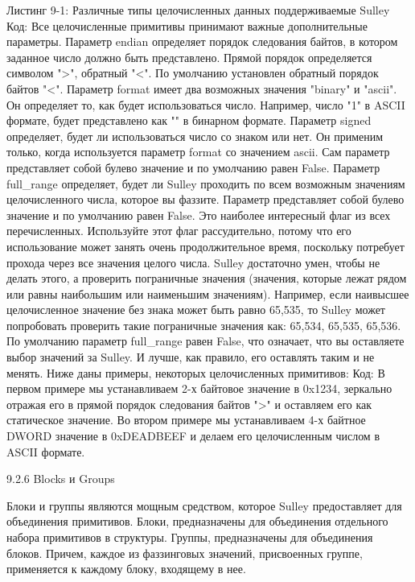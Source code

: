 \documentclass[12pt, a4paper, oneside]{book}
\begin{document}
Листинг 9-1: Различные типы целочисленных данных поддерживаемые Sulley
Код:
Все целочисленные примитивы принимают важные дополнительные параметры.
Параметр endian определяет порядок следования байтов, в котором заданное число должно быть представлено. Прямой порядок определяется символом ">", обратный "<". По умолчанию установлен обратный порядок байтов "<".
Параметр format имеет два возможных значения "binary" и "ascii". Он определяет то, как будет использоваться число. Например, число "1" в ASCII формате, будет представлено как "" в бинарном формате.
Параметр signed определяет, будет ли использоваться число со знаком или нет. Он применим только, когда используется параметр format со значением ascii. Сам параметр представляет собой булево значение и по умолчанию равен False.
Параметр full\_range определяет, будет ли Sulley проходить по всем возможным значениям целочисленного числа, которое вы фаззите. Параметр представляет собой булево значение и по умолчанию равен False. Это наиболее интересный флаг из всех перечисленных. Используйте этот флаг рассудительно, потому что его использование может занять очень продолжительное время, поскольку потребует прохода через все значения целого числа. Sulley достаточно умен, чтобы не делать этого, а проверить пограничные значения (значения, которые лежат рядом или равны наибольшим или наименьшим значениям). Например, если наивысшее целочисленное значение без знака может быть равно 65,535, то Sulley может попробовать проверить такие пограничные значения как: 65,534, 65,535, 65,536. По умолчанию параметр full\_range равен False, что означает, что вы оставляете выбор значений за Sulley. И лучше, как правило, его оставлять таким и не менять.
Ниже даны примеры, некоторых целочисленных примитивов:
Код:
В первом примере мы устанавливаем 2-х байтовое значение в 0x1234, зеркально отражая его в прямой порядок следования байтов ">" и оставляем его как статическое значение. Во втором примере мы устанавливаем 4-х байтное DWORD значение в 0xDEADBEEF и делаем его целочисленным числом в ASCII формате.

9.2.6 Blocks и Groups

Блоки и группы являются мощным средством, которое Sulley предоставляет для объединения примитивов. Блоки, предназначены для объединения отдельного набора примитивов в структуры. Группы, предназначены для объединения блоков. Причем, каждое из фаззинговых значений, присвоенных группе, применяется к каждому блоку, входящему в нее. 
\end{document}
